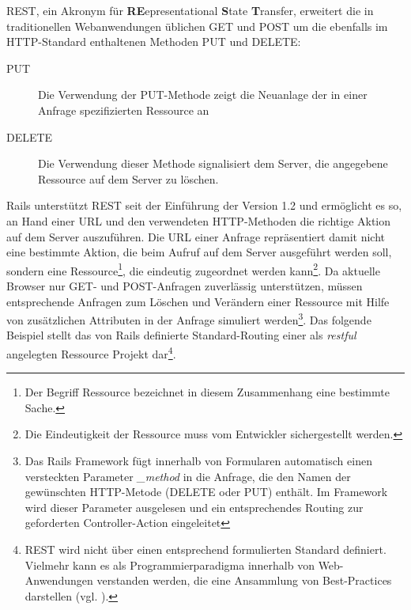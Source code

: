 REST, ein Akronym für \textbf{RE}epresentational \textbf{S}tate \textbf{T}ransfer, erweitert die in  traditionellen Webanwendungen üblichen GET und POST um die ebenfalls im HTTP-Standard enthaltenen Methoden PUT und DELETE:

\begin{description}
\item[PUT]
	Die Verwendung der PUT-Methode zeigt die Neuanlage der in einer	Anfrage spezifizierten Ressource an
\item[DELETE]
	Die Verwendung dieser Methode signalisiert dem Server, die angegebene Ressource auf dem Server zu löschen.
\end{description}
Rails unterstützt REST seit der Einführung der Version 1.2 und ermöglicht es so, an Hand einer URL und den verwendeten HTTP-Methoden die richtige Aktion auf dem Server auszuführen. Die URL einer Anfrage repräsentiert damit nicht eine bestimmte Aktion, die beim Aufruf auf dem Server ausgeführt werden soll, sondern eine Ressource\footnote{Der Begriff Ressource bezeichnet in diesem Zusammenhang eine bestimmte Sache.}, die eindeutig zugeordnet werden kann\footnote{Die Eindeutigkeit der Ressource muss vom Entwickler sichergestellt werden.}.
Da aktuelle Browser nur GET- und POST-Anfragen zuverlässig unterstützen, müssen entsprechende Anfragen zum Löschen und Verändern einer Ressource mit Hilfe von zusätzlichen Attributen in der Anfrage simuliert werden\footnote{Das Rails Framework fügt  innerhalb von Formularen automatisch einen versteckten Parameter \emph{\_method} in die Anfrage, die den Namen der gewünschten HTTP-Metode (DELETE oder PUT) enthält. Im Framework wird dieser Parameter ausgelesen und ein entsprechendes Routing zur geforderten Controller-Action eingeleitet}. Das folgende Beispiel stellt das von Rails definierte Standard-Routing einer als \emph{restful} angelegten Ressource Projekt dar\footnote{REST wird nicht über einen entsprechend formulierten Standard definiert. Vielmehr kann es als Programmierparadigma innerhalb von Web-Anwendungen verstanden werden, die eine Ansammlung von Best-Practices darstellen (vgl. \cite{restful}).}.

